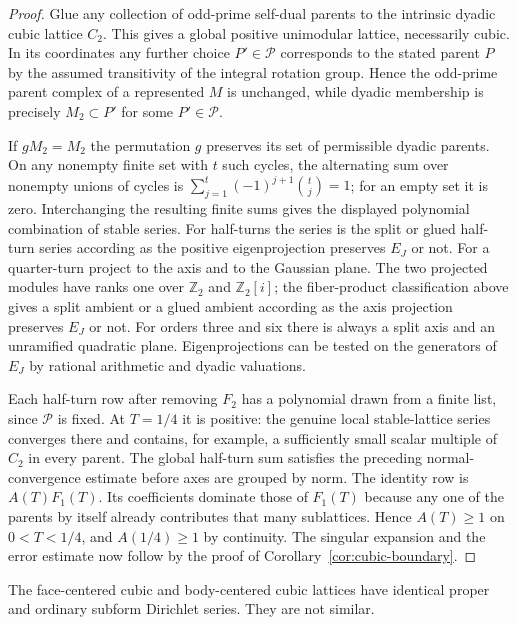 \begin{proof}
Glue any collection of odd-prime self-dual parents to the intrinsic
dyadic cubic lattice $C_2$. This gives a global positive unimodular
lattice, necessarily cubic. In its coordinates any further choice
$P'\in\mathcal P$ corresponds to the stated parent $P$ by the assumed
transitivity of the integral rotation group. Hence the odd-prime
parent complex of a represented $M$ is unchanged, while dyadic
membership is precisely $M_2\subset P'$ for some $P'\in\mathcal P$.

If $gM_2=M_2$ the permutation $g$ preserves its set of permissible
dyadic parents. On any nonempty finite set with $t$ such cycles, the
alternating sum over nonempty unions of cycles is
$\sum_{j=1}^t(-1)^{j+1}\binom tj=1$; for an empty set it is zero.
Interchanging the resulting finite sums gives the displayed polynomial
combination of stable series. For half-turns the series is the split
or glued half-turn series according as the positive eigenprojection
preserves $E_J$ or not. For a quarter-turn project to the axis and to
the Gaussian plane. The two projected modules have ranks one over
$\mathbb Z_2$ and $\mathbb Z_2[i]$; the fiber-product classification
above gives a split ambient or a glued ambient according as the axis
projection preserves $E_J$ or not. For orders three and six there is
always a split axis and an unramified quadratic plane. Eigenprojections
can be tested on the generators of
$E_J$ by rational arithmetic and dyadic valuations.

Each half-turn row after removing $F_2$ has a polynomial drawn from
a finite list, since $\mathcal P$ is fixed. At $T=1/4$ it is positive:
the genuine local stable-lattice series converges there and contains,
for example, a sufficiently small scalar multiple of $C_2$ in every
parent. The global half-turn sum satisfies the preceding normal-convergence
estimate before axes are grouped by norm. The identity
row is $A(T)F_1(T)$. Its coefficients dominate those of $F_1(T)$
because any one of the parents by itself already contributes that
many sublattices. Hence $A(T)\ge1$ on $0<T<1/4$, and $A(1/4)\ge1$
by continuity. The singular expansion and the error estimate now follow
by the proof of Corollary~\ref{cor:cubic-boundary}.
\end{proof}
\begin{corollary}\label{cor:fcc-bcc}
The face-centered cubic and body-centered cubic lattices have identical
proper and ordinary subform Dirichlet series. They are not similar.
\end{corollary}
